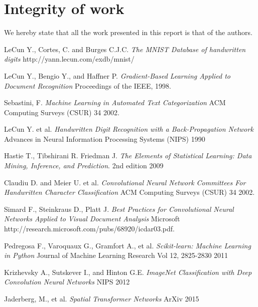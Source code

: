 \documentclass[conference]{IEEEtran}
\begin{document}
\section{Integrity of work}
We hereby state that all the work presented in this report is that of the authors.
\begin{thebibliography}{9}

LeCun Y., Cortes, C. and Burges C.J.C.
	\emph{The MNIST Database of handwritten digits}
	http://yann.lecun.com/exdb/mnist/


LeCun Y., Bengio Y., and Haffner P.
 \emph{Gradient-Based Learning Applied to Document Recognition}
 Proceedings of the IEEE,
 1998.

 
 Sebastini, F.
  \emph{Machine Learning in Automated Text Categorization}
  ACM Computing Surveys (CSUR) 34
  2002.

  LeCun Y. et al.
  \emph{Handwritten Digit Recognition with a Back-Propagation Network}
    Advances in Neural Information Processing Systems (NIPS)
    1990

 Hastie T., Tibshirani R. Friedman J.
 \emph{The Elements of 
Statistical Learning: Data Mining, Inference, and Prediction}.
2nd edition
2009


 Claudiu D. and Meier U. et al.
  \emph{Convolutional Neural Network Committees For Handwritten Character
Classification}
  ACM Computing Surveys (CSUR) 34
  2002.

  
  Simard F., Steinkraus D., Platt J.
  \emph{Best Practices for Convolutional Neural Networks
Applied to Visual Document Analysis}
	Microsoft
    http://research.microsoft.com/pubs/68920/icdar03.pdf.


Pedregosa F., Varoquaux G., Gramfort A., et al.
\emph{Scikit-learn: Machine Learning in {P}ython}
Journal of Machine Learning Research    
Vol 12, 2825-2830 2011   
       

Krizhevsky A., Sutskever I., and Hinton G.E.
\emph{ImageNet Classification with Deep Convolution Neural Networks}
	NIPS 2012


 Jaderberg, M., et al.
  \emph{Spatial Transformer Networks}
  ArXiv
  2015

\end{thebibliography}
\end{document}
